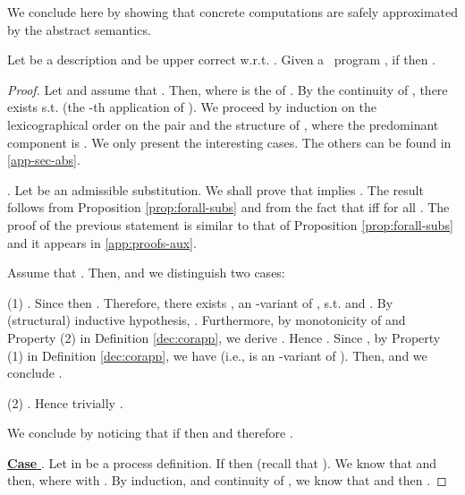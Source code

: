 \documentclass{tlp}
\begin{document}
We conclude here by showing that concrete computations are safely  approximated by the abstract semantics. 

\begin{theorem}\label{teo:corr}
Let   be a description and     be upper correct w.r.t. .   Given a  \utcc\ program , if 
 then  .  
\end{theorem}
\begin{proof} 
Let  and assume that . Then,  where  is the  of . By the continuity of ,  there exists  s.t.   (the -th application of ). 
We proceed by  induction on the lexicographical order on 
the pair  and the structure of , where the predominant component is  . We only present the interesting cases. The others can be found in \ref{app-sec-abs}. 


. 
Let  be an admissible substitution.
		We shall prove that   implies . 
		The result follows from Proposition 
		 \ref{prop:forall-subs}  and from the fact that 
		  iff  for all . The proof of the previous statement is similar to that of 
		 Proposition 
		 \ref{prop:forall-subs} and it appears in   \ref{app:proofs-aux}. 

Assume that . Then,    and we distinguish two cases:

\noindent(1) 
.
		Since  then 
		. Therefore, there exists , an -variant of , s.t.
		 and . 
		By (structural) inductive hypothesis, . Furthermore, by monotonicity of  and Property (2) in Definition \ref{dec:corapp}, we derive
		 . Hence
		. Since , 
		by Property (1) in Definition \ref{dec:corapp}, we have  (i.e.,  is an -variant of ).
		Then,  and we conclude  . 
		
\noindent(2) . Hence trivially . 

We conclude by noticing that if  then 
 and therefore .


\noindent \underline{\bf Case 	 }. 
Let   in  be a process definition. 
	If  then  (recall that ). We know that  and then, 
	  where 
	  with . By induction, and continuity of ,  we know that 
	 and then 
	.
\end{proof}
\end{document}
